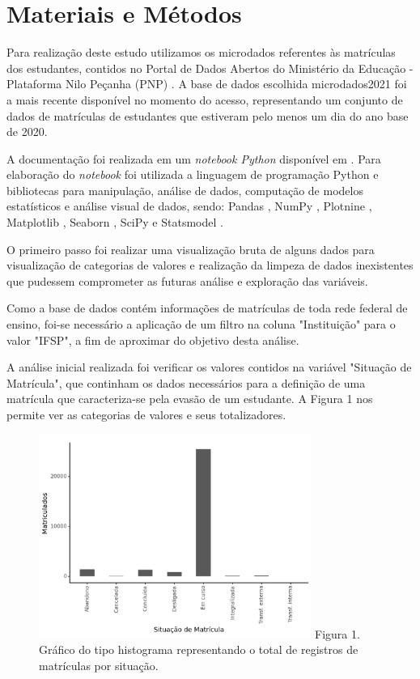 \documentclass[conference]{IEEEtran}
\begin{document}
\section{Materiais e Métodos}
Para realização deste estudo utilizamos os microdados referentes às matrículas dos estudantes, contidos no Portal de Dados Abertos do Ministério da Educação - Plataforma Nilo Peçanha (PNP) \cite{pnpdados2024}. A base de dados escolhida {microdados2021} foi a mais recente disponível no momento do acesso, representando um conjunto de dados de matrículas de estudantes que estiveram pelo menos um dia do ano base de 2020.\par
A documentação foi realizada em um \textit{notebook Python} disponível em \cite{notebook}. Para elaboração do \textit{notebook} foi utilizada a linguagem de programação Python \cite{python2024} e bibliotecas para manipulação, análise de dados, computação de modelos estatísticos e análise visual de dados, sendo: Pandas \cite{pandas2024}, NumPy \cite{numpy2024}, Plotnine \cite{plotnine20204}, Matplotlib \cite{matplot2024}, Seaborn \cite{seaborn2024}, SciPy \cite{scipy2024} e Statsmodel \cite{statsmodel2024}.\par
O primeiro passo foi realizar uma visualização bruta de alguns dados para visualização de categorias de valores e realização da limpeza de dados inexistentes que pudessem comprometer as futuras análise e exploração das variáveis.\par
Como a base de dados contém informações de matrículas de toda rede federal de ensino, foi-se necessário a aplicação de um filtro na coluna "Instituição" para o valor "IFSP", a fim de aproximar do objetivo desta análise.\par
A análise inicial realizada foi verificar os valores contidos na variável "Situação de Matrícula", que continham os dados necessários para a definição de uma matrícula que caracteriza-se pela evasão de um estudante. A Figura 1 nos permite ver as categorias de valores e seus totalizadores.\par

\begin{figure}[h]
    \includegraphics[width=8.9cm]{figs/figura-1.png}
    \centering
    Figura 1. Gráfico do tipo histograma representando o total de registros de matrículas por situação.
\end{figure}
\end{document}
